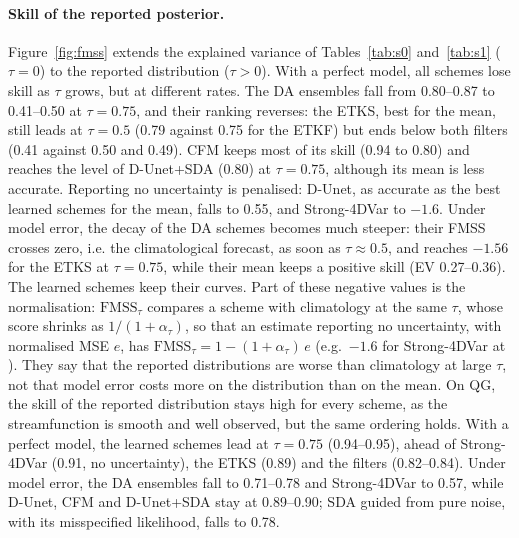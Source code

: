 \paragraph{Skill of the reported posterior.}
Figure~\ref{fig:fmss} extends the explained variance of Tables~\ref{tab:s0}
and~\ref{tab:s1} ($\tau = 0$) to the reported distribution ($\tau > 0$). With a perfect
model, all schemes lose skill as $\tau$ grows, but at different rates. The DA ensembles
fall from 0.80--0.87 to 0.41--0.50 at $\tau = 0.75$, and their ranking reverses: the ETKS,
best for the mean, still leads at $\tau = 0.5$ (0.79 against 0.75 for the ETKF) but ends
below both filters (0.41 against 0.50 and 0.49). CFM keeps most of its skill (0.94 to
0.80) and reaches the level of D-Unet+SDA (0.80) at $\tau = 0.75$, although its mean is
less accurate. Reporting no uncertainty is penalised: D-Unet, as accurate as the best
learned schemes for the mean, falls to 0.55, and Strong-4DVar to $-1.6$. Under model
error, the decay of the DA schemes becomes much steeper: their FMSS crosses zero, i.e.
the climatological forecast, as soon as $\tau \approx 0.5$, and reaches $-1.56$ for the
ETKS at $\tau = 0.75$, while their mean keeps a positive skill (EV 0.27--0.36). The learned
schemes keep their \Sz{} curves. Part of these negative values is the normalisation:
$\mathrm{FMSS}_\tau$ compares a scheme with climatology at the same $\tau$, whose score shrinks
as $1/(1+\alpha_\tau)$, so that an estimate reporting no uncertainty, with normalised MSE $e$,
has $\mathrm{FMSS}_\tau = 1 - (1+\alpha_\tau)\,e$ (e.g.\ $-1.6$ for Strong-4DVar at \Sz). They
say that the reported distributions are worse than climatology at large $\tau$, not that model
error costs more on the distribution than on the mean. On QG, the skill of the
reported distribution stays high for every scheme, as the streamfunction is smooth and
well observed, but the same ordering holds. With a perfect model, the learned schemes lead
at $\tau = 0.75$ (0.94--0.95), ahead of Strong-4DVar (0.91, no uncertainty), the ETKS
(0.89) and the filters (0.82--0.84). Under model error, the DA ensembles fall to
0.71--0.78 and Strong-4DVar to 0.57, while D-Unet, CFM and D-Unet+SDA stay at 0.89--0.90;
SDA guided from pure noise, with its misspecified likelihood, falls to 0.78. 


